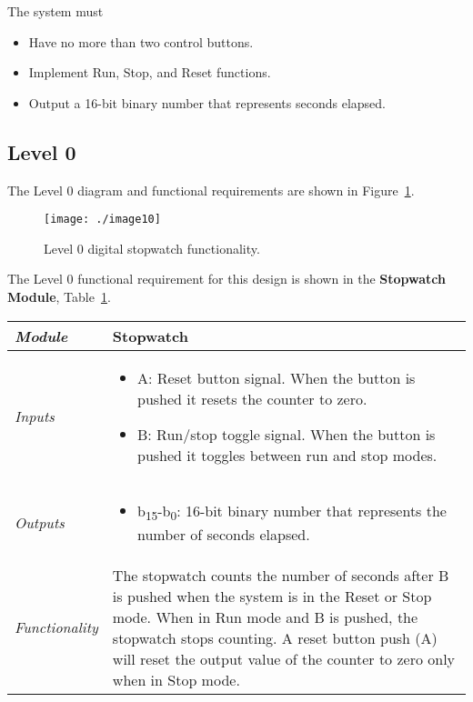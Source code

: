 The system must

\begin{itemize}
\item  Have no more than two control buttons.
\item  Implement Run, Stop, and Reset functions.
\item  Output a 16-bit binary number that represents seconds elapsed.
\end{itemize}

\subsection*{Level 0}
\label{subsection:level-0-1}


The Level 0 diagram and functional requirements are shown in
Figure~\ref{figure:level0Stopwatch}.

\begin{figure}[h]
\centering
\texttt{[image: ./image10]}
\caption{Level 0 digital stopwatch functionality.}
\label{figure:level0Stopwatch}
\end{figure}

The Level 0 functional requirement
for this design is shown in the \textbf{Stopwatch Module},
Table~\ref{table:level0StopWatch}.


\begin{table}[h]
\label{table:level0StopWatch}
\begin{tabular}{|l|m{10cm}|}
\hline
\emph{Module} & Stopwatch \\ \hline
\emph{Inputs} & 
\begin{itemize}
\item
  A: Reset button signal. When the button is pushed it resets the
  counter to zero.
\item
  B: Run/stop toggle signal. When the button is pushed it toggles
  between run and stop modes.
\end{itemize}\\ \hline

\emph{Outputs} & 
\begin{itemize}
\item
  b\textsubscript{15}-b\textsubscript{0}: 16-bit binary number that
  represents the number of seconds elapsed.
\end{itemize} \\ \hline
\emph{Functionality} & The stopwatch counts the number of seconds after
B is pushed when the system is in the Reset or Stop mode. When in Run
mode and B is pushed, the stopwatch stops counting. A reset button push
(A) will reset the output value of the counter to zero only when in Stop
mode. \\ \hline
\end{tabular}
\end{table}

